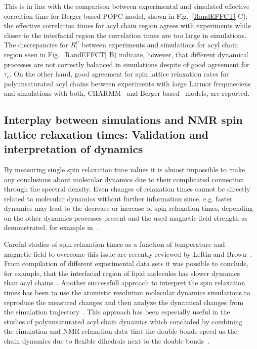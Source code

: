 \documentclass[aps,prl,superscriptaddress,twocolumn]{revtex4}
\begin{document}
This is in line with the comparison between experimental and simulated effective correltion time for Berger
based POPC model, shown in Fig.~\ref{RandEFFCT} C); the effective correlation times for acyl chain region agrees 
with experiments while closer to the interfacial region the correlation times are too large in simulations. 
The discrepancies for $R_1^{C}$ between experiments and simulations for acyl chain region seen in Fig.~\ref{RandEFFCT} B)
indicate, however, that different dynamical processes are not correctly balanced in simulations despite of good
agreement for $\tau_e$.  On the other hand, good agreement for spin lattice relaxation rates for polyunsaturated acyl chains
between experiments with large Larmor frequneciens and simulations with both, CHARMM~\cite{eldho03,klauda12} and Berger 
based~\cite{ollila07a} models, are reported.



\subsection{Interplay between simulations and NMR spin lattice relaxation times: Validation and interpretation of dynamics}

By measuring single spin relaxation time values it is almost impossible to make any conclusions
about molecular dynamics due to their complicated connection through the spectral density.
Even changes of relaxation times cannot be directly related to molecular dynamics without further
information since, e.g. faster dynamics may lead to the decrease or increase of spin relaxation times,
depending on the other dynamics processes present and the used magnetic field strength as demonstrated, for example in~\cite{ferreira15}.

Careful studies of spin relaxation times as a function of temperature and magnetic field to overcome this issue are 
recently reviewed by Leftin and Brown~\cite{leftin11}. From compilation of different experimental data sets it was possible 
to conclude, for example, that the interfacial region of lipid molecules has slower dynamics than acyl chains~\cite{leftin11}.
Another successfull approach to interpret the spin relaxation times has been to use the atomistic resolution molecular dynamics
simulations to reproduce the measured changes and then analyze the dynamical changes from the simulation trajectory~\cite{feller02,eldho03,nowacka13}.
This approach has been especially useful in the studies of polyunsaturated acyl chain dynamics which concluded
by combining the simulation and NMR relaxation data that the double bonds speed us the chain dynamics
due to flexible dihedrals next to the double bonds~\cite{feller02,eldho03,gawrisch03,stillwell03}.
\end{document}

